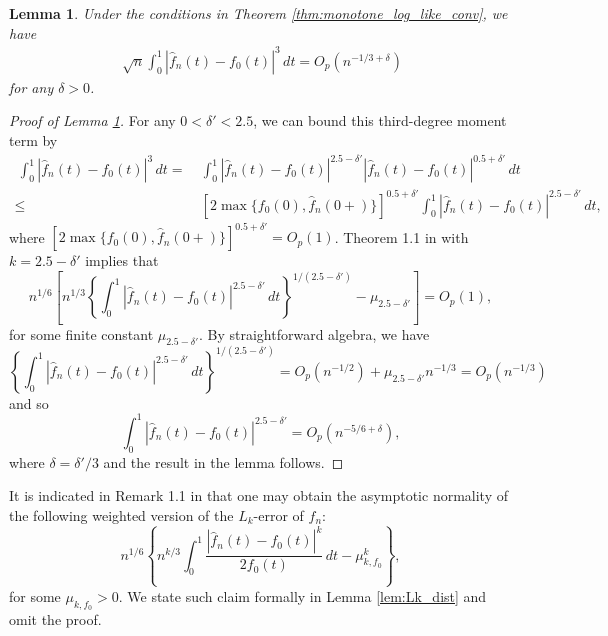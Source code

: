 \documentclass[12pt,letterpaper, twoside, openany]{article}
\theoremstyle{plain}
\newtheorem{lemma}[theorem]{Lemma}
\begin{document}
\begin{lemma}\label{lem:B2}
Under the conditions in Theorem \ref{thm:monotone_log_like_conv}, we have
\begin{align*}
	~\sqrt{n}\int_0^1
	|\hat{f}_n(t) - f_0(t)|^3\,dt = O_p(n^{-1/3 + \delta}) 
\end{align*}
for any $\delta > 0$.
\end{lemma}
\begin{proof}[Proof of Lemma \ref{lem:B2}]
For any $0 < \delta' < 2.5$, we can bound this third-degree moment term by
\begin{align*}
	~\int_0^1
	|\hat{f}_n(t) - f_0(t)|^3
	\,dt
	=&~ 
	\int_0^1\left|\hat{f}_n(t) - f_0(t)\right|^{2.5 -\delta'}\left|\hat{f}_n(t) - f_0(t)\right|^{0.5+\delta'}
	\,dt\\
	\leq&~ [2\max\{f_0(0), \hat{f}_n(0+)\}]^{0.5+\delta'}\int_0^1
	\left|\hat{f}_n(t) - f_0(t)\right|^{2.5-\delta'}
	\,dt, 
\end{align*}
where $[2\max\{f_0(0), \hat{f}_n(0+)\}]^{0.5+\delta'} = O_p(1)$.  Theorem 1.1 in \cite{Kulikov2005} with $k = 2.5-\delta'$ implies that
\begin{equation*}
	n^{1/6}\left[ n^{1/3}\left\{ \int_0^1
	\left|\hat{f}_n(t) - f_0(t)\right|^{2.5-\delta'}\,dt\right\}^{1/(2.5-\delta')} - \mu_{2.5 - \delta'}
	\right] = O_p(1),
\end{equation*}
for some finite constant $\mu_{2.5-\delta'}$. By straightforward algebra, we have
\begin{equation*}
	\left\{ \int_0^1
	\left|\hat{f}_n(t) - f_0(t)\right|^{2.5-\delta'}\,dt\right\}^{1/(2.5-\delta')} = O_p(n^{-1/2}) + \mu_{2.5 - \delta'}n^{-1/3} = O_p(n^{-1/3})
\end{equation*}
and so
\begin{equation*}
	\int_0^1
	\left|\hat{f}_n(t) - f_0(t)\right|^{2.5-\delta'} = O_p(n^{-5/6 + \delta}),
\end{equation*}
where $\delta = \delta'/3$ and the result in the lemma follows.

\end{proof}

It is indicated in Remark 1.1 in \cite{Kulikov2005} that one may obtain the asymptotic normality of the following weighted version of the $L_k$-error of $\hat{f}_n$:
\begin{equation*}
n^{1/6}\left\{n^{k/3} \int_0^1 \frac{|\hat{f}_n(t) - f_0(t)|^k}{2f_0(t)}\, dt - \mu_{k, f_0}^k\right\},
\end{equation*}
for some $\mu_{k, f_0}>0$. We state such claim formally in Lemma \ref{lem:Lk_dist} and omit the proof.
\end{document}
